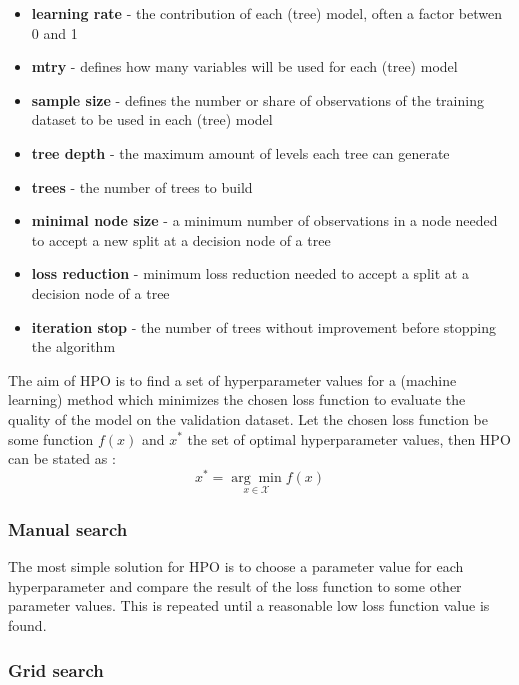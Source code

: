 \documentclass[12pt,a4paper]{article}
\begin{document}
\begin{itemize}
\item \textbf{learning rate} - the contribution of each (tree) model, often a factor betwen 0 and 1
\item \textbf{mtry}  - defines how many variables will be used for each (tree) model
\item \textbf{sample size} - defines the number or share of observations of the training dataset to be used in each (tree) model 
\item \textbf{tree depth} - the maximum amount of levels each tree can generate
\item \textbf{trees} - the number of trees to build
\item \textbf{minimal node size} - a minimum number of observations in a node needed to accept a new split at a decision node of a tree 
\item \textbf {loss reduction} - minimum loss reduction needed to accept a split at a decision node of a tree 
\item \textbf{iteration stop} - the number of trees without improvement before stopping the algorithm 
\end{itemize}

The aim of HPO is to find a set of hyperparameter values for a (machine learning) method which minimizes the chosen loss function to evaluate the quality of the model on the validation dataset. Let the chosen loss function be some function \(f(x)\) and \(x^*\) the set of optimal hyperparameter values, then HPO can be stated as :
\begin{equation}
x^* = \underset{x \in \mathcal{X}}{\arg \min }f(x)
\label{eq:HPO}
\end{equation}

\hypertarget{manual-search}{%
\subsubsection{Manual search}\label{manual-search}}

The most simple solution for HPO is to choose a parameter value for each hyperparameter and compare the result of the loss function to some other parameter values. This is repeated until a reasonable low loss function value is found.

\hypertarget{grid-search}{%
\subsubsection{Grid search}\label{grid-search}}
\end{document}
